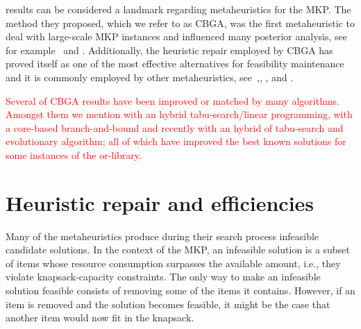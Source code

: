 \documentclass[3p,authoryear]{elsarticle}
\newcommand{\Orlib}{{\sc or-library}\xspace}
\begin{document}
 
\cite{chu1998} results can be considered a landmark regarding metaheuristics for the \gls{MKP}. The method they proposed, which we refer to as \gls{CBGA}, was the first metaheuristic to deal with large-scale \gls{MKP} instances and influenced many posterior analysis, see for example~\cite{gottlieb2000b,gottlieb2001} and \cite{tavares2006,tavares2008}. Additionally, the heuristic repair employed by \gls{CBGA} has proved itself as one of the most effective alternatives for feasibility maintenance and it is commonly employed by other metaheuristics, see~\cite{kong2008},\cite{wang2012,wang2012b}, \cite{martins2013a,martins2013}, \cite{chih2014} and \cite{azad2014}. %

\textcolor{red}{
Several of \gls{CBGA} results have been improved or matched by many algorithms. Amongst them we mention \cite{vasquez2005} with an hybrid tabu-search/linear programming, \cite{mansini2012} with a core-based branch-and-bound and recently \cite{LAI2018282} with an hybrid of tabu-search and evolutionary algorithm; all of which have improved the best known solutions for some instances of the \Orlib.
}%



%
%
%
%
%
%
%
\section{Heuristic repair and efficiencies}
Many of the metaheuristics produce during their search process infeasible candidate solutions. In the context of the \gls{MKP}, an infeasible solution is a subset of items whose resource consumption surpasses the available amount, i.e., they violate knapsack-capacity constraints. The only way to make an infeasible solution feasible consists of removing some of the items it contains. However, if an item is removed and the solution becomes feasible, it might be the case that another item would now fit in the knapsack. 
\end{document}
